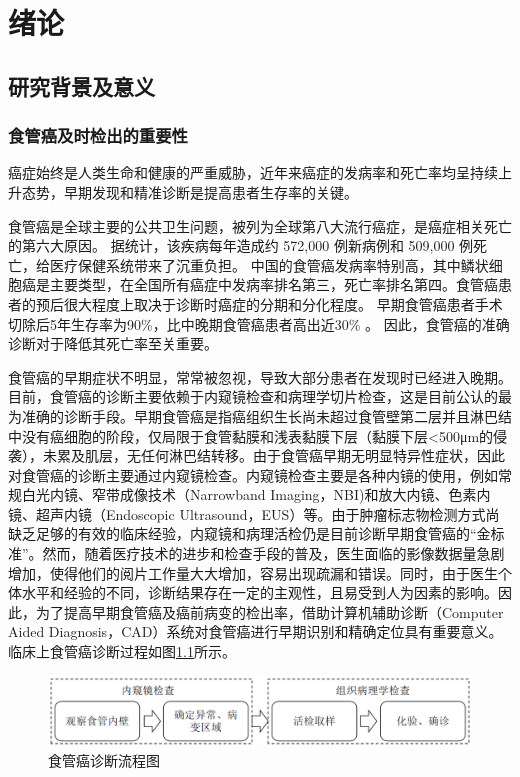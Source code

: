 
\chapter{绪论}
\section{研究背景及意义}

\subsection{食管癌及时检出的重要性}
癌症始终是人类生命和健康的严重威胁，近年来癌症的发病率和死亡率均呈持续上升态势，早期发现和精准诊断是提高患者生存率的关键。

食管癌是全球主要的公共卫生问题\cite{liu2017shenmai}，被列为全球第八大流行癌症，是癌症相关死亡的第六大原因。 据统计，该疾病每年造成约 572,000 例新病例和 509,000 例死亡\cite{bray2018global}，给医疗保健系统带来了沉重负担。 中国的食管癌发病率特别高，其中鳞状细胞癌是主要类型\cite{arnold2015global, wang2018global}，在全国所有癌症中发病率排名第三，死亡率排名第四\cite{chen2016national}。食管癌患者的预后很大程度上取决于诊断时癌症的分期和分化程度。 早期食管癌患者手术切除后5年生存率为90\%，比中晚期食管癌患者高出近30\% 。 因此，食管癌的准确诊断对于降低其死亡率至关重要。

食管癌的早期症状不明显，常常被忽视，导致大部分患者在发现时已经进入晚期。目前，食管癌的诊断主要依赖于内窥镜检查和病理学切片检查，这是目前公认的最为准确的诊断手段。早期食管癌是指癌组织生长尚未超过食管壁第二层并且淋巴结中没有癌细胞的阶段，仅局限于食管黏膜和浅表黏膜下层（黏膜下层<500μm的侵袭），未累及肌层，无任何淋巴结转移\cite{ajani2019esophageal}。由于食管癌早期无明显特异性症状，因此对食管癌的诊断主要通过内窥镜检查。内窥镜检查主要是各种内镜的使用，例如常规白光内镜、窄带成像技术（Narrowband Imaging，NBI)和放大内镜、色素内镜、超声内镜（Endoscopic Ultrasound，EUS）等。由于肿瘤标志物\cite{kaz2014epigenetic}检测方式尚缺乏足够的有效的临床经验，内窥镜和病理活检仍是目前诊断早期食管癌的“金标准”。然而，随着医疗技术的进步和检查手段的普及，医生面临的影像数据量急剧增加，使得他们的阅片工作量大大增加，容易出现疏漏和错误。同时，由于医生个体水平和经验的不同，诊断结果存在一定的主观性，且易受到人为因素的影响。因此，为了提高早期食管癌及癌前病变的检出率，借助计算机辅助诊断（Computer Aided Diagnosis，CAD）系统对食管癌进行早期识别和精确定位具有重要意义。临床上食管癌诊断过程如图\ref{诊断}所示。

\begin{figure}
\centering
\includegraphics[width=5.5 in]{data/intro_fig/诊断流程001.png}
\caption{食管癌诊断流程图}
\label{诊断}
\end{figure}


